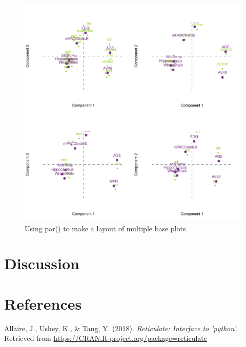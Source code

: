 \documentclass[man,floatsintext]{apa6}
\theoremstyle{definition}
\theoremstyle{definition}
\theoremstyle{definition}
\theoremstyle{remark}
\begin{document}
\begin{figure}[H]

{\centering \includegraphics{2_RMarkdown_APA_Manuscript_files/figure-latex/unnamed-chunk-1-1} 

}

\caption{Using par() to make a layout of multiple base plots}\label{fig:unnamed-chunk-1}
\end{figure}

\hypertarget{discussion}{%
\section{Discussion}\label{discussion}}

\newpage

\hypertarget{references}{%
\section{References}\label{references}}

\begingroup
\setlength{\parindent}{-0.5in}
\setlength{\leftskip}{0.5in}

\hypertarget{refs}{}
\leavevmode\hypertarget{ref-R-reticulate}{}%
Allaire, J., Ushey, K., \& Tang, Y. (2018). \emph{Reticulate: Interface
to 'python'}. Retrieved from
\url{https://CRAN.R-project.org/package=reticulate}
\end{document}
